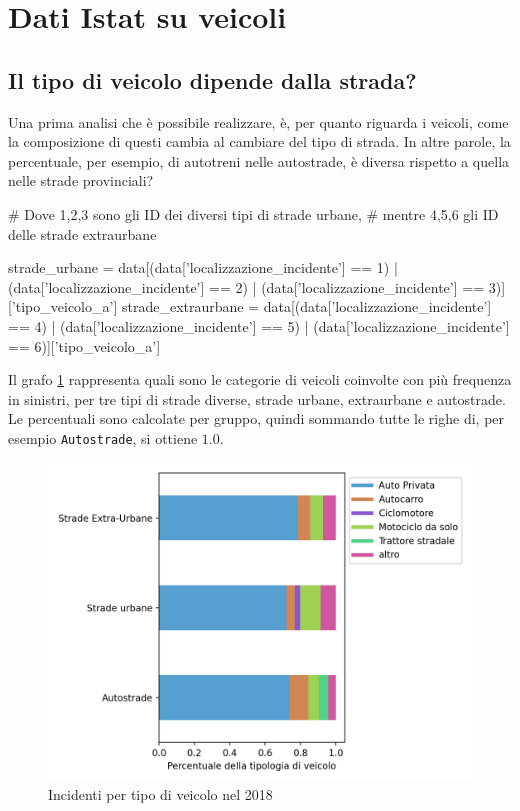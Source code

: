 \documentclass[a4paper,12pt]{report}
\newcommand{\columnstyle}[1]{\texttt{#1}}
\begin{document}
\section{Dati Istat su veicoli}

\subsection{Il tipo di veicolo dipende dalla strada?}

Una prima analisi che è possibile realizzare, è, per quanto riguarda i veicoli, come 
la composizione di questi cambia al cambiare del tipo di strada. 
In altre parole, la percentuale, per esempio, di autotreni nelle autostrade, è diversa rispetto 
a quella nelle strade provinciali? 

\begin{code}[language=Python]
# Dove 1,2,3 sono gli ID dei diversi tipi di strade urbane, 
# mentre 4,5,6 gli ID delle strade extraurbane

strade_urbane = data[(data['localizzazione_incidente'] == 1) | (data['localizzazione_incidente'] == 2) | (data['localizzazione_incidente'] == 3)]['tipo_veicolo_a']
strade_extraurbane = data[(data['localizzazione_incidente'] == 4) | (data['localizzazione_incidente'] == 5) | (data['localizzazione_incidente'] == 6)]['tipo_veicolo_a']
\end{code}

Il grafo \ref{fig:differenza-strade} rappresenta quali sono le categorie di veicoli 
coinvolte con più frequenza in sinistri, per tre tipi di strade diverse, strade urbane, 
extraurbane e autostrade. 
Le percentuali sono calcolate per gruppo, quindi sommando 
tutte le righe di, per esempio \columnstyle{Autostrade}, si ottiene $1.0$.

\begin{figure}
    \includegraphics[width=\linewidth]{../src/incidenti/incidenti_senza_coords/tipo_veicoli/differenza_strade.png}
    \caption{Incidenti per tipo di veicolo nel 2018}
    \label{fig:differenza-strade}
\end{figure}
\end{document}
